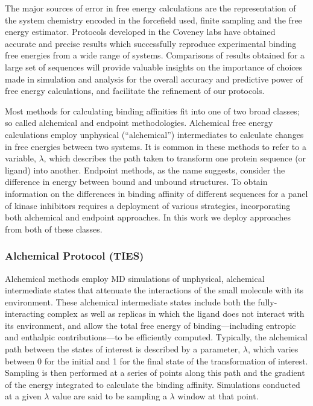 \documentclass[conference]{IEEEtran}
\begin{document}
The major sources of error in free energy calculations are the representation
of the system chemistry encoded in the forcefield used, finite sampling and
the free energy estimator. Protocols developed in the Coveney labs have
obtained accurate and precise results which successfully reproduce
experimental binding free energies from a wide range of systems.
\cite{Wright2014, Wan2017brd4, Wan2015, Wan2011} Comparisons of results
obtained for a large set of sequences will provide valuable insights on the
importance of choices made in simulation and analysis for the overall accuracy
and predictive power of free energy calculations, and facilitate the
refinement of our protocols.


Most methods for calculating binding affinities fit into one of two broad classes; so called alchemical and endpoint methodologies. 
Alchemical free energy calculations employ unphysical (“alchemical”) intermediates to calculate changes in free energies between two systems. 
It is common in these methods to refer to a variable, $\lambda$, which describes the path taken to transform one protein sequence (or ligand) into another. 
Endpoint methods, as the name suggests, consider the difference in energy between bound and unbound structures. 
To obtain information on the differences in binding affinity of different sequences for a panel of kinase inhibitors requires a deployment of various strategies, incorporating both alchemical and endpoint approaches. 
In this work we deploy approaches from both of these classes.


\subsubsection{Alchemical Protocol (TIES)}\label{sec:ties}

Alchemical methods employ MD simulations of unphysical, alchemical intermediate states that attenuate the interactions of the small molecule with its environment. 
These alchemical intermediate states include both the fully-interacting complex as well as replicas in which the ligand does not interact with its environment, and allow the total free energy of binding—including entropic and enthalpic contributions—to be efficiently computed. Typically, the alchemical path between the states of interest is described by a parameter, $\lambda$, which varies between 0 for the initial and 1 for the final state of the transformation of interest. 
Sampling is then performed at a series of points along this path and the gradient of the energy integrated to calculate the binding affinity.
Simulations conducted at a given $\lambda$ value are said to be sampling a $\lambda$ window at that point.
\end{document}
